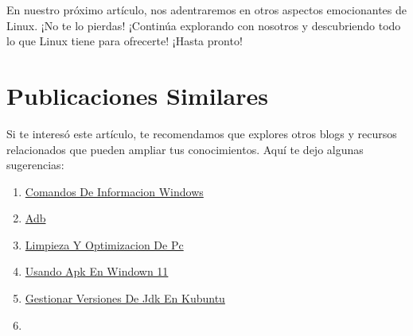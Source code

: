 \documentclass[
  jou,
  floatsintext,
  longtable,
  a4paper,
  nolmodern,
  notxfonts,
  notimes,
  colorlinks=true,linkcolor=blue,citecolor=blue,urlcolor=blue]{apa7}
\providecommand{\tightlist}{%
  \setlength{\itemsep}{0pt}\setlength{\parskip}{0pt}}
\begin{document}
En nuestro próximo artículo, nos adentraremos en otros aspectos
emocionantes de Linux. ¡No te lo pierdas! ¡Continúa explorando con
nosotros y descubriendo todo lo que Linux tiene para ofrecerte! ¡Hasta
pronto!

\section{Publicaciones Similares}\label{publicaciones-similares}

Si te interesó este artículo, te recomendamos que explores otros blogs y
recursos relacionados que pueden ampliar tus conocimientos. Aquí te dejo
algunas sugerencias:

\begin{enumerate}
\def\labelenumi{\arabic{enumi}.}
\tightlist
\item
  \href{https://achalmaedison.netlify.app/tecnologia-seguridad/operating-system/2017-05-21-comandos-de-informacion-windows/index.pdf}{}
  \href{https://achalmaedison.netlify.app/tecnologia-seguridad/operating-system/2017-05-21-comandos-de-informacion-windows}{Comandos
  De Informacion Windows}
\item
  \href{https://achalmaedison.netlify.app/tecnologia-seguridad/operating-system/2019-06-19-adb/index.pdf}{}
  \href{https://achalmaedison.netlify.app/tecnologia-seguridad/operating-system/2019-06-19-adb}{Adb}
\item
  \href{https://achalmaedison.netlify.app/tecnologia-seguridad/operating-system/2021-08-17-limpieza-y-optimizacion-de-pc/index.pdf}{}
  \href{https://achalmaedison.netlify.app/tecnologia-seguridad/operating-system/2021-08-17-limpieza-y-optimizacion-de-pc}{Limpieza
  Y Optimizacion De Pc}
\item
  \href{https://achalmaedison.netlify.app/tecnologia-seguridad/operating-system/2021-10-21-usando-apk-en-windown-11/index.pdf}{}
  \href{https://achalmaedison.netlify.app/tecnologia-seguridad/operating-system/2021-10-21-usando-apk-en-windown-11}{Usando
  Apk En Windown 11}
\item
  \href{https://achalmaedison.netlify.app/tecnologia-seguridad/operating-system/2022-05-12-gestionar-versiones-de-jdk-en-kubuntu/index.pdf}{}
  \href{https://achalmaedison.netlify.app/tecnologia-seguridad/operating-system/2022-05-12-gestionar-versiones-de-jdk-en-kubuntu}{Gestionar
  Versiones De Jdk En Kubuntu}
\item
  \href{https://achalmaedison.netlify.app/tecnologia-seguridad/operating-system/2022-07-21-instalar-tor-browser/index.pdf}{}

\end{enumerate}
\end{document}
